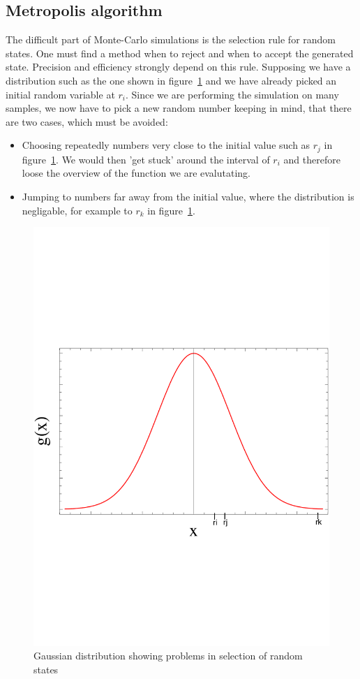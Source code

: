 \subsection{Metropolis algorithm}\label{sec:metropolis}
The difficult part of Monte-Carlo simulations is the selection rule for random states. One must find a method when to reject and when to accept the generated state. Precision and efficiency strongly depend on this rule. Supposing we have a distribution such as the one shown in figure~\ref{fig:distribution} and we have already picked an initial random variable at $r_i$. Since we are performing the simulation on many samples, we now have to pick a new random number keeping in mind, that there are two cases, which must be avoided:
\begin{itemize}
\item Choosing repeatedly numbers very close to the initial value such as $r_j$ in figure~\ref{fig:distribution}. We would then 'get stuck' around the interval of $r_i$ and therefore loose the overview of the function we are evalutating.
\item Jumping to numbers far away from the initial value, where the distribution is negligable, for example to $r_k$ in figure~\ref{fig:distribution}. 
\end{itemize}
\begin{figure}[htbp]
    \centering
    \includegraphics[scale=0.45]{distribution}
    \caption{Gaussian distribution showing problems in selection of random states}
    \label{fig:distribution}
\end{figure}

